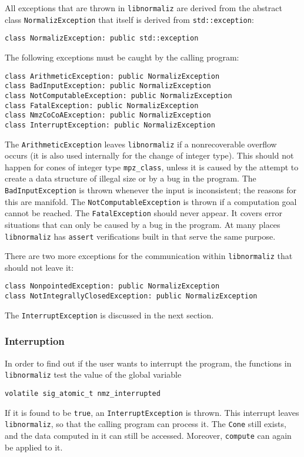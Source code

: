 \documentclass[12pt,a4paper]{scrartcl}
\theoremstyle{definition}
\begin{document}
\begin{small}
All exceptions that are thrown in \verb|libnormaliz| are derived from the abstract class \verb|NormalizException| that itself is derived from \verb|std::exception|:
\begin{Verbatim}
class NormalizException: public std::exception
\end{Verbatim}

The following exceptions must be caught by the calling program:
\begin{Verbatim}
class ArithmeticException: public NormalizException
class BadInputException: public NormalizException
class NotComputableException: public NormalizException
class FatalException: public NormalizException
class NmzCoCoAException: public NormalizException
class InterruptException: public NormalizException
\end{Verbatim}

The \verb|ArithmeticException| leaves \verb|libnormaliz| if a nonrecoverable overflow occurs (it is also used internally for the change of integer type). This should not happen for cones of integer type \verb|mpz_class|, unless it is caused by the attempt to create a data structure of illegal size or by a bug in the program. The \verb|BadInputException| is thrown whenever the input is inconsistent; the reasons for this are manifold. The \verb|NotComputableException| is thrown if a computation goal cannot be reached. The \verb|FatalException| should never appear. It covers error situations that can only be caused by a bug in the program. At many places \verb|libnormaliz| has \verb|assert| verifications built in that serve the same purpose.

There are two more exceptions for the communication within \verb|libnormaliz| that should not leave it:
\begin{Verbatim}
class NonpointedException: public NormalizException 
class NotIntegrallyClosedException: public NormalizException
\end{Verbatim}

The \verb|InterruptException| is discussed in the next section.

\subsubsection{Interruption}

In order to find out if the user wants to interrupt the program, the functions in \verb|libnormaliz| test the value of the global variable
\begin{Verbatim}
volatile sig_atomic_t nmz_interrupted
\end{Verbatim}
If it is found to be \verb|true|, an \verb|InterruptException| is thrown. This interrupt leaves \verb|libnormaliz|, so that the calling program can process it. The \verb|Cone| still exists, and the data computed in it can still be accessed. Moreover, \verb|compute| can again be applied to it.


\end{small}
\end{document}
